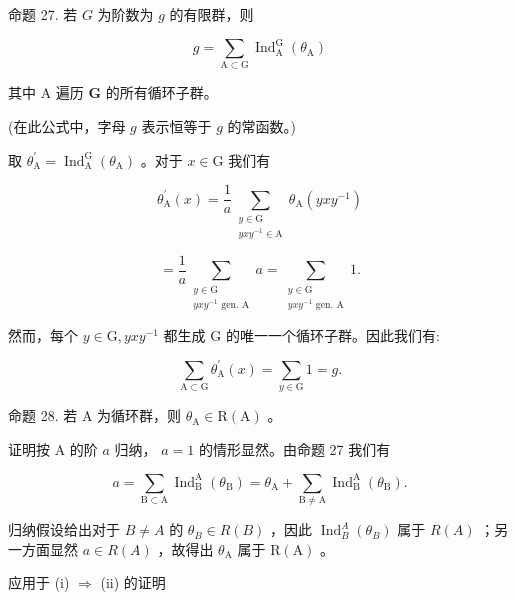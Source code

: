 \documentclass[10pt]{article}
\begin{document}
命题 27. 若 \(G\) 为阶数为 \(g\) 的有限群，则

\[
g = \mathop{\sum }\limits_{{\mathrm{A} \subset  \mathrm{G}}}{\operatorname{Ind}}_{\mathrm{A}}^{\mathrm{G}}\left( {\theta }_{\mathrm{A}}\right)
\]

其中 A 遍历 \(\mathbf{G}\) 的所有循环子群。

(在此公式中，字母 \(g\) 表示恒等于 \(g\) 的常函数。)

取 \({\theta }_{\mathrm{A}}^{\prime } = {\operatorname{Ind}}_{\mathrm{A}}^{\mathrm{G}}\left( {\theta }_{\mathrm{A}}\right)\) 。对于 \(x \in  \mathrm{G}\) 我们有

\[
{\theta }_{\mathrm{A}}^{\prime }\left( x\right)  = \frac{1}{a}\mathop{\sum }\limits_{\substack{{y \in  \mathrm{G}} \\  {{yx}{y}^{-1} \in  \mathrm{A}} }}{\theta }_{\mathrm{A}}\left( {{yx}{y}^{-1}}\right)
\]

\[
= \frac{1}{a}\mathop{\sum }\limits_{\substack{{y \in  \mathrm{G}} \\  {{yx}{y}^{-1}\text{ gen. }\mathrm{A}} }}a = \mathop{\sum }\limits_{\substack{{y \in  \mathrm{G}} \\  {{yx}{y}^{-1}\text{ gen. }\mathrm{A}} }}1.
\]

然而，每个 \(y \in  \mathrm{G},{yx}{y}^{-1}\) 都生成 \(\mathrm{G}\) 的唯一一个循环子群。因此我们有:

\[
\mathop{\sum }\limits_{{\mathrm{A} \subset  \mathrm{G}}}{\theta }_{\mathrm{A}}^{\prime }\left( x\right)  = \mathop{\sum }\limits_{{y \in  \mathrm{G}}}1 = g.
\]

命题 28. 若 \(\mathrm{A}\) 为循环群，则 \({\theta }_{\mathrm{A}} \in  \mathrm{R}\left( \mathrm{A}\right)\) 。

证明按 \(\mathrm{A}\) 的阶 \(a\) 归纳， \(a = 1\) 的情形显然。由命题 27 我们有

\[
a = \mathop{\sum }\limits_{{\mathrm{B} \subset  \mathrm{A}}}{\operatorname{Ind}}_{\mathrm{B}}^{\mathrm{A}}\left( {\theta }_{\mathrm{B}}\right)  = {\theta }_{\mathrm{A}} + \mathop{\sum }\limits_{{\mathrm{B} \neq  \mathrm{A}}}{\operatorname{Ind}}_{\mathrm{B}}^{\mathrm{A}}\left( {\theta }_{\mathrm{B}}\right) .
\]

归纳假设给出对于 \(B \neq  A\) 的 \({\theta }_{B} \in  R\left( B\right)\) ，因此 \({\operatorname{Ind}}_{B}^{A}\left( {\theta }_{B}\right)\) 属于 \(R\left( A\right)\) ；另一方面显然 \(a \in  R\left( A\right)\) ，故得出 \({\theta }_{\mathrm{A}}\) 属于 \(\mathrm{R}\left( \mathrm{A}\right)\) 。

应用于 (i) \(\Rightarrow\) (ii) 的证明
\end{document}
